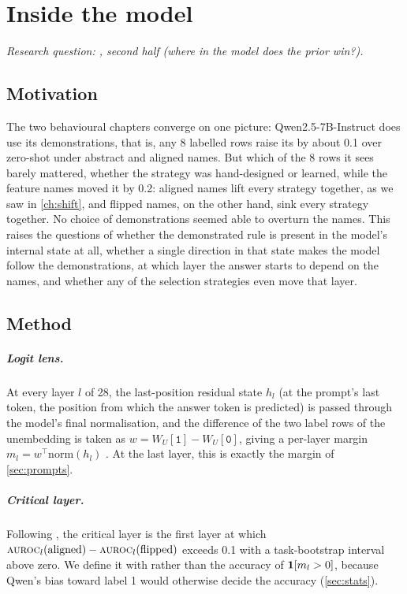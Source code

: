 \chapter{Inside the model}
\label{ch:mechanism}

\emph{Research question: , second half (where in the model does the prior win?).}

\section{Motivation}

The two behavioural chapters converge on one picture: Qwen2.5-7B-Instruct does use its demonstrations, that is, any 8 labelled rows raise its \AUROC by about 0.1 over zero-shot under abstract and aligned names. But which of the 8 rows it sees barely mattered, whether the strategy was hand-designed or learned, while the feature names moved it by 0.2: aligned names lift every strategy together, as we saw in \autoref{ch:shift}, and flipped names, on the other hand, sink every strategy together. No choice of demonstrations seemed able to overturn the names. This raises the questions of whether the demonstrated rule is present in the model's internal state at all, whether a single direction in that state makes the model follow the demonstrations, at which layer the answer starts to depend on the names, and whether any of the selection strategies even move that layer.

\section{Method}
\paragraph{Logit lens.}

At every layer $l$ of 28, the last-position residual state $h_l$ (at the prompt's last token, the position from which the answer token is predicted) is passed through the model's final normalisation, and the difference of the two label rows of the unembedding is taken as $w = W_U[\texttt{1}] - W_U[\texttt{0}]$, giving a per-layer margin $m_l = w^\top \mathrm{norm}(h_l)$ \citep{nostalgebraist2020logit,elhage2021mathematical}. At the last layer, this is exactly the margin of \autoref{sec:prompts}.

\newpage
\paragraph{Critical layer.}
Following \citet{halawi2024overthinking}, the critical layer is the first layer at which $\textsc{auroc}_l(\text{aligned}) - \textsc{auroc}_l(\text{flipped})$ exceeds 0.1 with a task-bootstrap interval above zero.
We define it with \AUROC rather than the accuracy of $\mathbf{1}[m_l > 0]$, because Qwen's bias toward label 1 would otherwise decide the accuracy (\autoref{sec:stats}).

